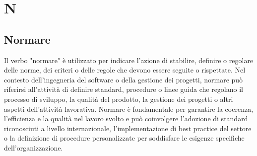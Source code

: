 \section{N}

\vspace{2em}
\subsection*{Normare}
Il verbo "normare" è utilizzato per indicare l'azione di stabilire, definire o regolare delle norme, dei criteri o delle regole che devono essere seguite o rispettate. Nel contesto dell'ingegneria del software o della gestione dei progetti, normare può riferirsi all'attività di definire standard, procedure o linee guida che regolano il processo di sviluppo, la qualità del prodotto, la gestione dei progetti o altri aspetti dell'attività lavorativa. Normare è fondamentale per garantire la coerenza, l'efficienza e la qualità nel lavoro svolto e può coinvolgere l'adozione di standard riconosciuti a livello internazionale, l'implementazione di best practice del settore o la definizione di procedure personalizzate per soddisfare le esigenze specifiche dell'organizzazione.